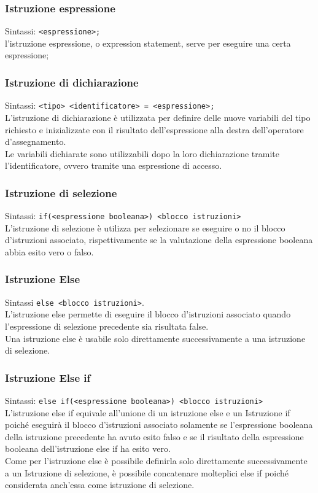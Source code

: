 \subsubsection{Istruzione espressione}
Sintassi: \lstinline|<espressione>;| \\
l'istruzione espressione, o expression statement, serve per eseguire una certa espressione; 


\subsubsection{Istruzione di dichiarazione}
Sintassi: \lstinline|<tipo> <identificatore> = <espressione>;| \\
L'istruzione di dichiarazione è utilizzata per definire delle nuove variabili del tipo 
richiesto e inizializzate con il risultato dell'espressione alla destra dell'operatore d'assegnamento. \\
Le variabili dichiarate sono utilizzabili dopo la loro dichiarazione tramite l'identificatore, ovvero
tramite una espressione di accesso. 

\subsubsection{Istruzione di selezione}
Sintassi: \lstinline|if(<espressione booleana>) <blocco istruzioni>| \\
L'istruzione di selezione è utilizza per selezionare se eseguire o no il blocco d'istruzioni
associato, rispettivamente se la valutazione della espressione booleana abbia esito vero o falso.

\subsubsection{Istruzione Else}
Sintassi \lstinline|else <blocco istruzioni>|. \\
L'istruzione else permette di eseguire il blocco d'istruzioni associato quando l'espressione
di selezione precedente sia risultata false. \\
Una istruzione else è usabile solo direttamente successivamente a una istruzione di selezione.

\subsubsection{Istruzione Else if}
Sintassi: \lstinline|else if(<espressione booleana>) <blocco istruzioni>| \\
L'istruzione else if equivale all'unione di un istruzione else e un Istruzione if poiché 
eseguirà il blocco d'istruzioni associato solamente se l'espressione booleana della 
istruzione precedente ha avuto esito falso e se il risultato della espressione booleana 
dell'istruzione else if ha esito vero. \\
Come per l'istruzione else è possibile definirla solo direttamente successivamente a un Istruzione 
di selezione, è possibile concatenare molteplici else if poiché considerata anch'essa come 
istruzione di selezione.


